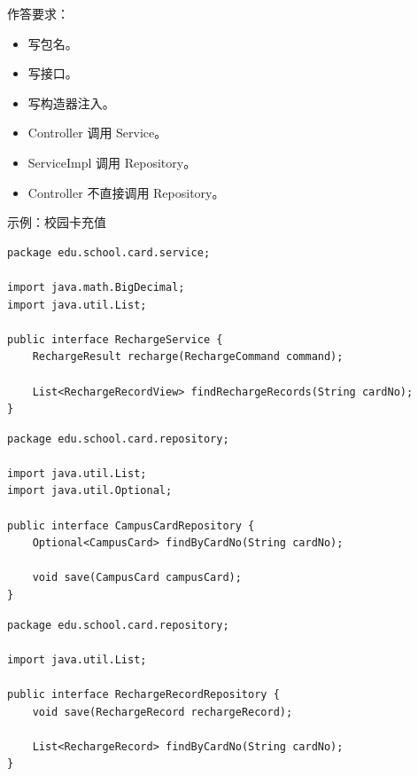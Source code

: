 \documentclass[UTF8,zihao=-4]{ctexart}
\begin{document}
作答要求：

\begin{itemize}
\item 写包名。
\item 写接口。
\item 写构造器注入。
\item Controller 调用 Service。
\item ServiceImpl 调用 Repository。
\item Controller 不直接调用 Repository。
\end{itemize}

示例：校园卡充值

\small
\begin{verbatim}
package edu.school.card.service;

import java.math.BigDecimal;
import java.util.List;

public interface RechargeService {
    RechargeResult recharge(RechargeCommand command);

    List<RechargeRecordView> findRechargeRecords(String cardNo);
}
\end{verbatim}
\normalsize

\small
\begin{verbatim}
package edu.school.card.repository;

import java.util.List;
import java.util.Optional;

public interface CampusCardRepository {
    Optional<CampusCard> findByCardNo(String cardNo);

    void save(CampusCard campusCard);
}
\end{verbatim}
\normalsize

\small
\begin{verbatim}
package edu.school.card.repository;

import java.util.List;

public interface RechargeRecordRepository {
    void save(RechargeRecord rechargeRecord);

    List<RechargeRecord> findByCardNo(String cardNo);
}
\end{verbatim}
\normalsize
\end{document}
